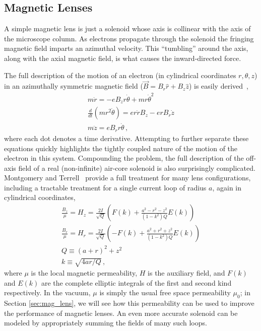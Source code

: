 \subsection{Magnetic Lenses} \label{sec:mag_lens_model}

A simple magnetic lens is just a solenoid whose axis is collinear with the axis of the microscope column.
As electrons propagate through the solenoid the fringing magnetic field imparts an azimuthal velocity.
This ``tumbling'' around the axis, along with the axial magnetic field, is what causes the inward-directed force. 

The full description of the motion of an electron (in cylindrical coordinates $r, \theta, z$) in an azimuthally symmetric magnetic field ($\vec{B} = B_r \hat{r} + B_z \hat{z}$) is easily derived~\cite{el-kareh_electron_1970},
\begin{subequations} \label{eq:lens_eq_of_motion}
\begin{gather}
  m \ddot{r} = -e B_z r \dot{\theta} + m r \dot{\theta}^2                 \\
  \frac{d}{dt} ( m r^2 \dot{\theta} ) = e r \dot{r} B_z - e r B_r \dot{z} \\
  m \ddot{z} = e B_r r \dot{\theta} \,\text{,}
\end{gather}
\end{subequations}
where each dot denotes a time derivative.
Attempting to further separate these equations quickly highlights the tightly coupled nature of the motion of the electron in this system.
Compounding the problem, the full description of the off-axis field of a real (non-infinite) air-core solenoid is also surprisingly complicated.
Montgomery and Terrell~\cite{montgomery_some_1961} provide a full treatment for many lens configurations, including a tractable treatment for a single current loop of radius $a$, again in cylindrical coordinates, 
\begin{subequations} \label{eq:field_of_loop}
\begin{gather}
  \frac{B_z}{\mu} = H_z = \frac{2I}{\sqrt{Q}} \left(   F(k) + \frac{ a^2 - r^2 - z^2 }{ (1-k^2) Q } E(k) \right) \\
  \frac{B_r}{\mu} = H_r = \frac{2I}{\sqrt{Q}} \left( - F(k) + \frac{ a^2 + r^2 + z^2 }{ (1-k^2) Q } E(k) \right) \\
  Q \equiv (a+r)^2 + z^2 \\
  k \equiv \sqrt{ 4 a r / Q } \,\text{,}
\end{gather}
\end{subequations}
where $\mu$ is the local magnetic permeability, $H$ is the auxiliary field, and $F(k)$ and $E(k)$ are the complete elliptic integrals of the first and second kind respectively.
In the vacuum, $\mu$ is simply the usual free space permeability $\mu_0$; in Section \ref{sec:mag_lens}, we will see how this permeability can be used to improve the performance of magnetic lenses.
An even more accurate solenoid can be modeled by appropriately summing the fields of many such loops.

